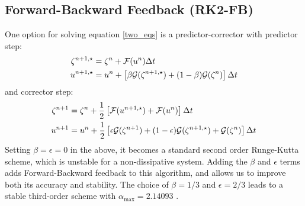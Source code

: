 \subsection{Forward-Backward Feedback (RK2-FB)}
One option for solving equation \ref{two_eqs} is a predictor-corrector
with predictor step:
\begin{equation}\begin{split}
   \zeta^{n+1,\star} &= \zeta^n + {\cal F}(u^n)\Delta t \\
   u^{n+1,\star} &= u^n + \left[\beta {\cal G}(\zeta^{n+1,\star}) +
   (1-\beta) {\cal G}(\zeta^n)\right] \Delta t
\end{split}\end{equation}
and corrector step:
\begin{equation}\begin{split}
   \zeta^{n+1} &= \zeta^n + \frac{1}{2} \left[{\cal F}(u^{n+1,\star}) +
   {\cal F}(u^n) \right] \Delta t \\
   u^{n+1} &= u^n + \frac{1}{2} \left[\epsilon {\cal G}(\zeta^{n+1}) +
   (1-\epsilon){\cal G}(\zeta^{n+1,\star}) + {\cal G}(\zeta^n)
   \right] \Delta t
\end{split}\end{equation}
Setting $\beta = \epsilon = 0$ in the above, it becomes a standard
second order Runge-Kutta scheme, which is unstable for a
non-dissipative system. Adding the $\beta$ and $\epsilon$ terms adds
Forward-Backward feedback to this algorithm, and allows us to
improve both its accuracy and stability. The choice of $\beta = 1/3$
and $\epsilon = 2/3$ leads to a stable third-order scheme with
$\alpha_{\max} = 2.14093$ \citep{SS2008b}.


